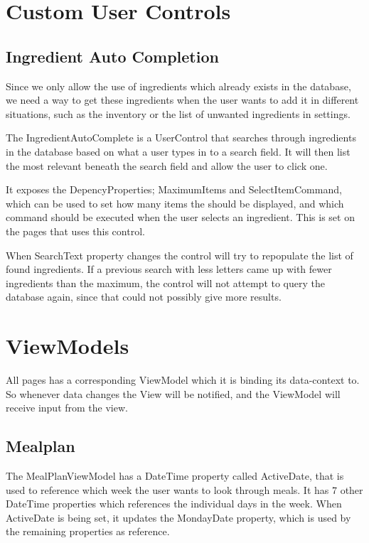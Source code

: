 \chapter{Custom User Controls}

\section{Ingredient Auto Completion} \label{sec:AutoComplete}
Since we only allow the use of ingredients which already exists in the database, we need a way to get these ingredients when the user wants to add it in different situations, such as the inventory or the list of unwanted ingredients in settings.

The IngredientAutoComplete is a UserControl that searches through ingredients in the database based on what a user types in to a search field. It will then list the most relevant beneath the search field and allow the user to click one.

It exposes the DepencyProperties; MaximumItems and SelectItemCommand, which can be used to set how many items the should be displayed, and which command should be executed when the user selects an ingredient. This is set on the pages that uses this control.

When SearchText property changes the control will try to repopulate the list of found ingredients. If a previous search with less letters came up with fewer ingredients than the maximum, the control will not attempt to query the database again, since that could not possibly give more results.

\chapter{ViewModels}
All pages has a corresponding ViewModel which it is binding its data-context to. So whenever data changes the View will be notified, and the ViewModel will receive input from the view.

\section{Mealplan}

The MealPlanViewModel has a DateTime property called ActiveDate, that is used to reference which week the user wants to look through meals. It has 7 other DateTime properties which references the individual days in the week. When ActiveDate is being set, it updates the MondayDate property, which is used by the remaining properties as reference.

